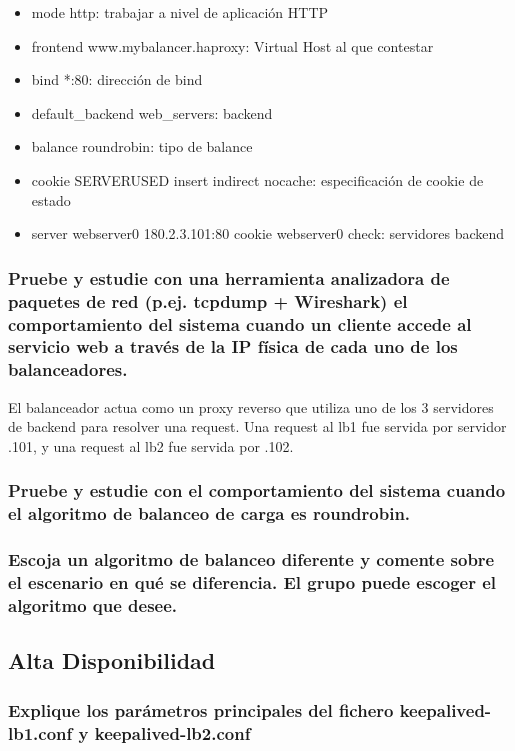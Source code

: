 \documentclass[12pt]{article}
\begin{document}
    \begin{itemize}
        \item mode http: trabajar a nivel de aplicación HTTP
        \item frontend www.mybalancer.haproxy: Virtual Host al que contestar
        \item bind *:80: dirección de bind
        \item default\_backend web\_servers: backend
        \item balance roundrobin: tipo de balance
        \item cookie SERVERUSED insert indirect nocache: especificación de cookie de estado
        \item server webserver0 180.2.3.101:80 cookie webserver0 check: servidores backend
    \end{itemize}

    \subsubsection{Pruebe y estudie con una herramienta analizadora de paquetes de red (p.ej. tcpdump + Wireshark) el comportamiento del sistema cuando un cliente accede al servicio web a través de la IP física de cada uno de los balanceadores.}

    El balanceador actua como un proxy reverso que utiliza uno de los 3 servidores de backend para resolver una request. Una request al lb1 fue servida por servidor .101, y una request al lb2 fue servida por .102.

    \subsubsection{Pruebe y estudie con el comportamiento del sistema cuando el algoritmo de balanceo de carga es roundrobin.}

    \subsubsection{Escoja un algoritmo de balanceo diferente y comente sobre el escenario en qué se diferencia. El grupo puede escoger el algoritmo que desee.}
    
    \subsection{Alta Disponibilidad}

    \subsubsection{Explique los parámetros principales del fichero keepalived-lb1.conf y keepalived-lb2.conf}
\end{document}
